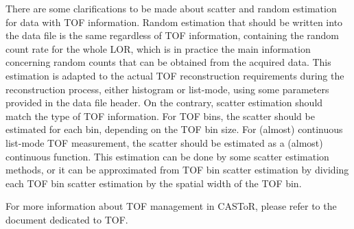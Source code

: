 \documentclass[a4paper, 11pt]{article}
\begin{document}
There are some clarifications to be made about scatter and random estimation for data with TOF information. Random estimation that should be written into the data file is the same regardless of TOF information, containing the random count rate for the whole LOR, which is in practice the main information concerning random counts that can be obtained from the acquired data. This estimation is adapted to the actual TOF reconstruction requirements during the reconstruction process, either histogram or list-mode, using some parameters provided in the data file header. On the contrary, scatter estimation should match the type of TOF information. For TOF bins, the scatter should be estimated for each bin, depending on the TOF bin size. For (almost) continuous list-mode TOF measurement, the scatter should be estimated as a (almost) continuous function. This estimation can be done by some scatter estimation methods, or it can be approximated from TOF bin scatter estimation by dividing each TOF bin scatter estimation by the spatial width of the TOF bin.

For more information about TOF management in CASToR, please refer to the document dedicated to TOF.
\end{document}
